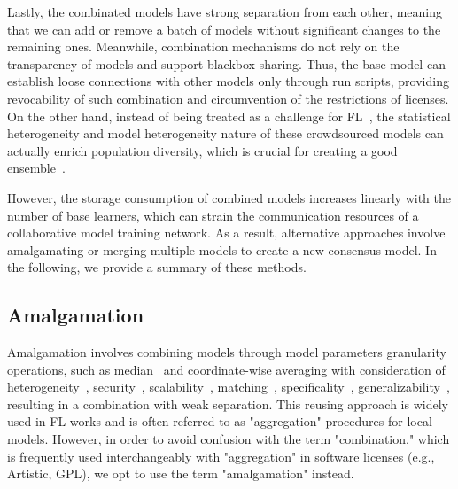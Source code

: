 Lastly, the combinated models have strong separation from each other, meaning that we can add or remove a batch of models without significant changes to the remaining ones.
Meanwhile, combination mechanisms do not rely on the transparency of models and support blackbox sharing. 
Thus, the base model can establish loose connections with other models only through run scripts, providing revocability of such combination and circumvention of the restrictions of licenses.
On the other hand, instead of being treated as a challenge for FL~\cite{ma2022state}, the statistical heterogeneity and model heterogeneity nature of these crowdsourced models can actually enrich population diversity, which is crucial for creating a good ensemble~\cite{maclin1995combining, opitz1995generating}. 

However, the storage consumption of combined models increases linearly with the number of base learners, which can strain the communication resources of a collaborative model training network. 
As a result, alternative approaches involve amalgamating or merging multiple models to create a new consensus model. 
In the following, we provide a summary of these methods.

\subsection{Amalgamation}
\label{sec:amalgamation}
Amalgamation involves combining models through model parameters granularity operations, such as median~\cite{blanchard2017machine, pillutla2022robust} and coordinate-wise averaging with consideration of heterogeneity~\cite{mcmahan2017communication, li2018federated}, security~\cite{sun2019can}, scalability~\cite{reisizadeh2020fedpaq}, matching~\cite{wang2020federated, yu2021fed2}, specificality~\cite{gudur2020resource}, generalizability~\cite{qu2022generalized}, resulting in a combination with weak separation.
This reusing approach is widely used in FL works and is often referred to as "aggregation" procedures for local models.
However, in order to avoid confusion with the term "combination," which is frequently used interchangeably with "aggregation" in software licenses (e.g., Artistic, GPL), we opt to use the term "amalgamation" instead.

